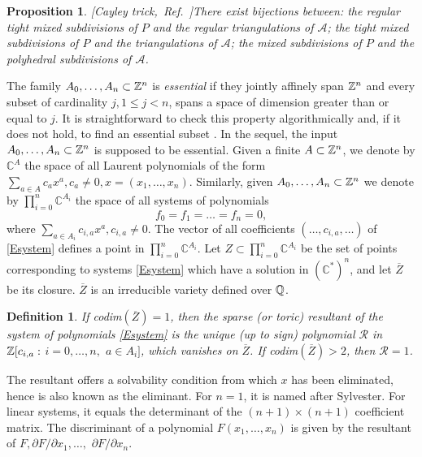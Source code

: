 \documentclass{article}
\newtheorem{proposition}{Proposition}
\newtheorem{definition}{Definition}
\newcommand\refcite[1]{\citealp{#1}} \newcommand\citess[1]{\textsuperscript{\textup{\citealp{#1}}}}
\def\CC{{\mathbb C}} \def\PP{{\mathbb P}}
\def\A{{\mathcal A}} \def\R{{\mathcal R}}
\begin{document}
\begin{proposition}{\rm [Cayley
trick,~Ref.~\refcite{GKZ}]}\label{P:Cayley_trick}
There exist bijections between:
the regular tight mixed subdivisions of $P$ and
the regular triangulations of $\A$;
the tight mixed subdivisions of $P$ and the triangulations of $\A$;
the mixed subdivisions of $P$ and the polyhedral subdivisions of $\A$. 
\end{proposition} 

The family $A_0,\dots,A_n \subset{\mathbb Z}^n$ is \textit{essential}
if they jointly affinely span ${\mathbb Z}^n$ and every subset
of cardinality $j, 1\le j<n$, spans a space of dimension greater than or equal to $j$.
It is straightforward to check this property algorithmically and, if it
does not hold, to find an essential subset \citess{St94}. 
In the sequel, the input $A_0,\dots,A_n\subset {\mathbb Z}^n$ is supposed
to be essential. 
Given a finite $A\subset {\mathbb Z}^n$, we denote by $\CC^A$ the space of all Laurent polynomials
of the form $\sum_{a\in A} c_a x^a, c_a\neq 0, x=(x_1,\ldots,x_n)$.
Similarly, given $A_0,\dots,A_n \subset{\mathbb Z}^n$ we denote by $\prod_{i=0}^n \CC^{A_i}$
the space of all systems of polynomials
\begin{equation}\label{Esystem}
f_0=f_1=\dots=f_n=0,
\end{equation}
where $\sum_{a\in A_i} c_{i,a} x^a, c_{i,a}\neq 0$.
The vector of all coefficients $(\ldots,c_{i,a},\ldots)$ of \eqref{Esystem} defines 
a point in $\prod_{i=0}^n \CC^{A_i}$.
Let $Z\subset\prod_{i=0}^n \CC^{A_i}$ be the set of points corresponding to 
systems \eqref{Esystem} which have a solution in $(\CC^*)^n$,
and let $\overline{Z}$ be its closure. $\overline{Z}$ is an irreducible variety defined over ${\mathbb Q}$.  

\begin{definition}\label{Dresultant}
If {\rm codim}$(\overline{Z})=1$, then the
\textit{sparse (or toric) resultant} of the system of polynomials \eqref{Esystem} 
is the unique (up to sign)
polynomial $\R$ in ${\mathbb Z}[ c_{i,a}:$ $i =0,\dots, n,$ $a\in A_i]$,
which vanishes on $\overline{Z}$.
If {\rm codim}$(\overline{Z})>2$, then $\R=1$.
\end{definition}

The resultant offers a solvability condition from which $x$
has been eliminated, hence is also known as the eliminant. 
For $n=1$, it is named after Sylvester.
For linear systems, it equals the determinant of the
$(n+1)\times (n+1)$ coefficient matrix.
The discriminant of a polynomial $F(x_1,\dots,x_n)$ is given by the resultant
of $F,\partial F / \partial x_1, \dots,$ $\partial F / \partial x_n$.
\end{document}
